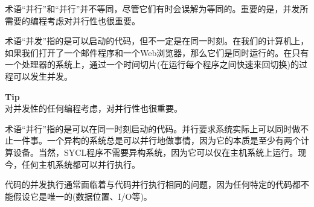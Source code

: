 术语“并行”和“并行”并不等同，尽管它们有时会误解为等同的。重要的是，并发所需要的编程考虑对并行性也很重要。\par

术语“并发”指的是可以启动的代码，但不一定是在同一时刻。在我们的计算机上，如果我们打开了一个邮件程序和一个Web浏览器，那么它们是同时运行的。在只有一个处理器的系统上，通过一个时间切片(在运行每个程序之间快速来回切换)的过程可以发生并发。\par

\begin{tcolorbox}[colback=blue!5!white,colframe=blue!75!black]
\textbf{Tip} \\
对并发性的任何编程考虑，对并行性也很重要。
\end{tcolorbox}

术语“并行”指的是可以在同一时刻启动的代码。并行要求系统实际上可以同时做不止一件事。一个异构的系统总是可以并行地做事情，因为它的本质是至少有两个计算设备。当然，SYCL程序不需要异构系统，因为它可以仅在主机系统上运行。现今，任何主机系统都可以并行执行。\par

代码的并发执行通常面临着与代码并行执行相同的问题，因为任何特定的代码都不能假设它是唯一的(数据位置、I/O等)。\par








